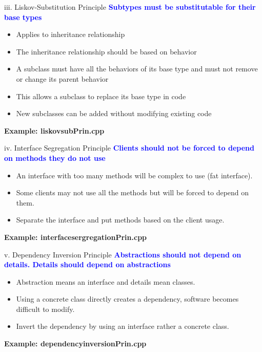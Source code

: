 \documentclass[13pt]{beamer}
\begin{document}
\begin{frame}{iii. Liskov-Substitution Principle}
	\textcolor{blue}{\textbf{Subtypes must be substitutable for their base types}}
	\begin{itemize}
		\item Applies to inheritance relationship
		\item The inheritance relationship should be based on behavior
		\item A subclass must have all the behaviors of its base type and must not remove or change its parent behavior
		\item This allows a subclass to replace its base type in code
		\item New subclasses can be added without modifying existing code
	\end{itemize}
	\textbf{Example: liskovsubPrin.cpp}
\end{frame}

\begin{frame}{iv. Interface Segregation Principle}
	\textcolor{blue}{\textbf{Clients should not be forced to depend on methods they do not use}}
	\begin{itemize}
		\item An interface with too many methods will be complex to use (fat interface).
		\item Some clients may not use all the methods but will be forced to depend on them.
		\item Separate the interface and put methods based on the client usage.
	\end{itemize}
\textbf{Example: interfacesergregationPrin.cpp }
\end{frame}

\begin{frame}{v. Dependency Inversion Principle}
	\textcolor{blue}{\textbf{Abstractions should not depend on details. Details should depend on abstractions}}
	\begin{itemize}
		\item Abstraction means an interface and details mean classes.
		\item Using a concrete class directly creates a dependency, software becomes difficult to 			  modify.
		\item Invert the dependency by using an interface rather a concrete class.
	\end{itemize}
\textbf{Example: dependencyinversionPrin.cpp}
\end{frame}
\end{document}
